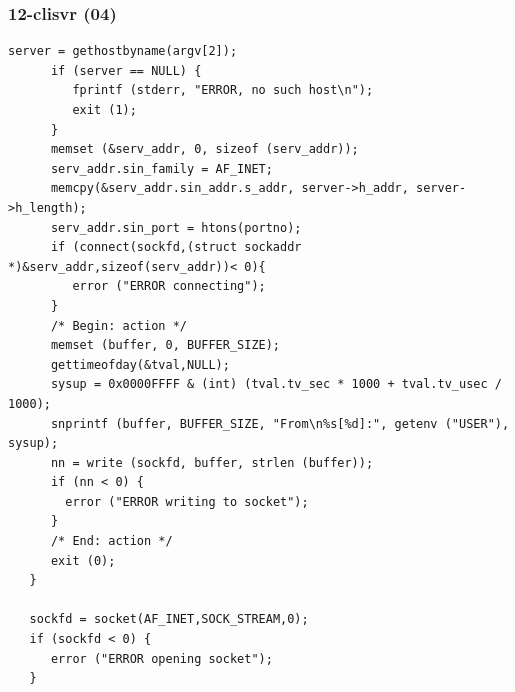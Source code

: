 \documentclass[xcolor=table, notheorems, hyperref={pdfpagelabels=false}]{beamer}
\begin{document}
\begin{frame}[fragile]
\frametitle{12-clisvr (04)}
\begin{lstlisting}[basicstyle=\ttfamily\tiny]
      server = gethostbyname(argv[2]);
      if (server == NULL) {
         fprintf (stderr, "ERROR, no such host\n");
         exit (1);
      }
      memset (&serv_addr, 0, sizeof (serv_addr));
      serv_addr.sin_family = AF_INET;
      memcpy(&serv_addr.sin_addr.s_addr, server->h_addr, server->h_length);
      serv_addr.sin_port = htons(portno);
      if (connect(sockfd,(struct sockaddr *)&serv_addr,sizeof(serv_addr))< 0){
         error ("ERROR connecting");
      }
      /* Begin: action */
      memset (buffer, 0, BUFFER_SIZE);
      gettimeofday(&tval,NULL);
      sysup = 0x0000FFFF & (int) (tval.tv_sec * 1000 + tval.tv_usec / 1000);
      snprintf (buffer, BUFFER_SIZE, "From\n%s[%d]:", getenv ("USER"), sysup);
      nn = write (sockfd, buffer, strlen (buffer));
      if (nn < 0) {
        error ("ERROR writing to socket");
      }
      /* End: action */
      exit (0);
   }

   sockfd = socket(AF_INET,SOCK_STREAM,0);
   if (sockfd < 0) {
      error ("ERROR opening socket");
   }

\end{lstlisting}
\end{frame}
\end{document}
